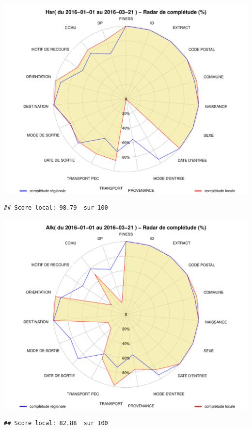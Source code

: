\documentclass[]{article}
\begin{document}
\includegraphics{completude_files/figure-latex/finess-13.pdf}

\begin{verbatim}
## Score local: 98.79  sur 100
\end{verbatim}

\includegraphics{completude_files/figure-latex/finess-14.pdf}

\begin{verbatim}
## Score local: 82.88  sur 100
\end{verbatim}
\end{document}
